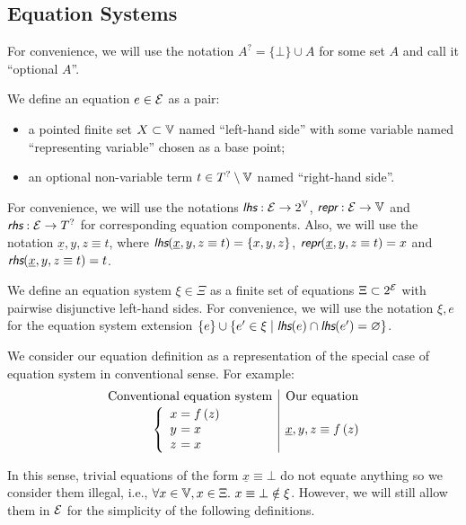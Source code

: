 \subsection{Equation Systems}

For convenience, we will use the notation $A^? = \{ \bot \} \cup A$ for some set $A$ and call it ``optional $A$''.

We define an equation $e \in \mathcal{E}$ as a pair:
\begin{itemize}
    \item a pointed finite set $X \subset \mathbb{V}$ named ``left-hand side'' with some variable named ``representing variable'' chosen as a base point;
    \item an optional non-variable term $t \in T^? \setminus \mathbb{V}$ named ``right-hand side''.
\end{itemize}

For convenience, we will use the notations $\lhs : \E \rightarrow 2^\V$, $\repr : \E \rightarrow \V$ and $\rhs : \E \rightarrow T^?$ for corresponding equation components. Also, we will use the notation $\underline{x}, y, z \equiv t$, where $\lhs(\underline{x}, y, z \equiv t) = \{ x, y, z \}$, $\repr(\underline{x}, y, z \equiv t) = x$ and $\rhs(\underline{x}, y, z \equiv t) = t$.

We define an equation system $\xi \in \Xi$ as a finite set of equations $\Xi \subset 2^{\mathcal{E}}$ with pairwise disjunctive left-hand sides. For convenience, we will use the notation $\xi, e$ for the equation system extension $\{ e \} \cup \{ e' \in \xi \mid \lhs(e) \cap \lhs(e') = \emptyset \}$.

We consider our equation definition as a representation of the special case of equation system in conventional sense. For example:
\begin{equation*}
    \begin{array}{c|c}
        \text{Conventional equation system} & \text{Our equation} \\[2pt]
        \left\{\begin{array}{l@{{}={}}l}
            x & f\,(z) \\
            y & x \\
            z & x \\
        \end{array}\right. & \underline{x}, y, z \equiv f\,(z) \\
    \end{array}
\end{equation*}

In this sense, trivial equations of the form $\underline{x} \equiv \bot$ do not equate anything so we consider them illegal, i.e., $\forall x \in \mathbb{V}, x \in \Xi. ~ x \equiv \bot \notin \xi$. However, we will still allow them in $\mathcal{E}$ for the simplicity of the following definitions.

